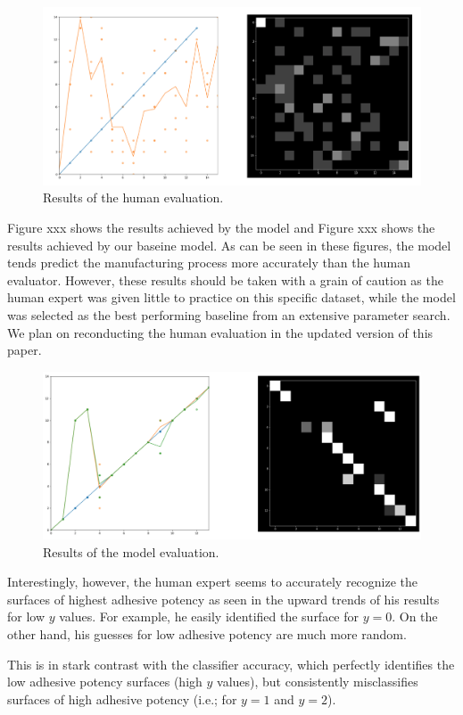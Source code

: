 \documentclass[10pt,twocolumn,letterpaper]{article}
\begin{document}
\begin{figure}[h]
	\centering
	\includegraphics[width=0.9\linewidth]{"./figures/Figure7"}
	\caption{
		Results of the human evaluation.
	}
\end{figure}

Figure xxx shows the results achieved by the model and Figure xxx shows the results achieved by our baseine model.
As can be seen in these figures, the model tends predict the manufacturing 
process more accurately than the human evaluator.
However, these results should be taken with a grain of caution 
as the human expert was given little to practice on this specific dataset,
while the model was selected as the best performing baseline from an extensive parameter search.
We plan on reconducting the human evaluation in the updated version of this paper.

\begin{figure}[h]
	\centering
	\includegraphics[width=0.9\linewidth]{"./figures/Figure8"}
	\caption{
		Results of the model evaluation.
	}
\end{figure}

Interestingly, however, the human expert seems to accurately recognize 
the surfaces of highest adhesive potency as seen in the upward trends of his results 
for low $y$ values. For example, he easily identified the surface for $y=0$.
On the other hand, his guesses for low adhesive potency are much more random.

This is in stark contrast with the classifier accuracy, which perfectly identifies
the low adhesive potency surfaces (high $y$ values), but consistently misclassifies 
surfaces of high adhesive potency (i.e.; for $y=1$ and $y=2$).
\end{document}
